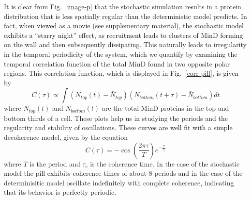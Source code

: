 \documentclass{pnastwo}
\begin{document}
\begin{article}
It is clear from Fig.~\ref{image-p} that the stochastic simulation
results in a protein distribution that is less spatially regular than
the deterministic model predicts.  In fact, when viewed as a movie
(see supplementary material), the stochastic model exhibits a ``starry
night'' effect, as recruitment leads to clusters of MinD forming on
the wall and then subsequently dissipating.  This naturally leads to
irregularity in the temporal periodicity of the system, which we
quantify by examining the temporal correlation function of the total
MinD found in two opposite polar regions.
%
This correlation function, which is displayed in Fig.~\ref{corr-pill},
is given by
\begin{equation}
  C(\tau) \propto \int
  (N_{\textit{top}}(t) - \bar N_{\textit{top}})
  (N_{\textit{bottom}}(t+\tau) - \bar N_{\textit{bottom}})dt
\end{equation}
where $N_{\textit{top}}(t)$ and $N_{\textit{bottom}}(t)$ are the total
MinD proteins in the top and bottom thirds of a cell.  These plots
help us in studying the periods and the regularity and stability of
oscillations.  These curves are well fit with a simple decoherence
model, given by the equation
\begin{equation}
  C(\tau) = -\cos\left(\frac{2\pi\tau}{T}\right) e^{-\frac{\tau}{\tau_c}}
\end{equation}
where $T$ is the period and $\tau_c$ is the coherence time.  In the
case of the stochastic model the pill exhibits coherence times of
about 8 periods and in the case of the determinisitic model oscillate
indefinitely with complete coherence, indicating that its behavior is
perfectly periodic.


\end{article}
\end{document}
